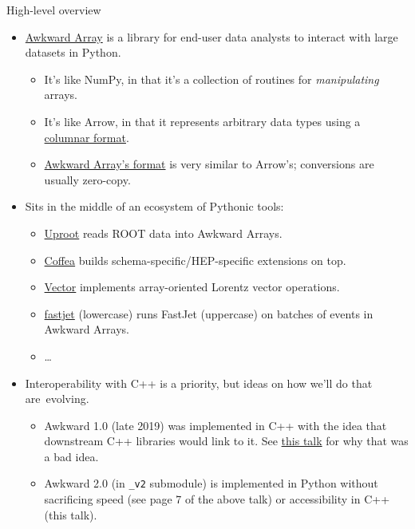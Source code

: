 \documentclass[aspectratio=169]{beamer}
\begin{document}
\begin{frame}{High-level overview}
\vspace{0.4 cm}
\begin{itemize}\setlength{\itemsep}{0.25 cm}
\item \textcolor{blue}{\href{https://inspirehep.net/literature/1806222}{Awkward Array}} is a library for end-user data analysts to interact with large datasets in Python.
\begin{itemize}
\item It's like NumPy, in that it's a collection of routines for {\it manipulating} arrays.
\item It's like Arrow, in that it represents arbitrary data types using a \textcolor{blue}{\href{https://arrow.apache.org/docs/format/Columnar.html}{columnar format}}.
\item \textcolor{blue}{\href{https://awkward-array.readthedocs.io/en/latest/ak.layout.Content.html}{Awkward Array's format}} is very similar to Arrow's; conversions are usually zero-copy.
\end{itemize}

\item<2-> Sits in the middle of an ecosystem of Pythonic tools:
\begin{itemize}
\item \textcolor{blue}{\href{https://pypi.org/project/uproot/}{Uproot}} reads ROOT data into Awkward Arrays.
\item \textcolor{blue}{\href{https://pypi.org/project/coffea/}{Coffea}} builds schema-specific/HEP-specific extensions on top.
\item \textcolor{blue}{\href{https://pypi.org/project/vector/}{Vector}} implements array-oriented Lorentz vector operations.
\item \textcolor{blue}{\href{https://pypi.org/project/fastjet/}{fastjet}} (lowercase) runs FastJet (uppercase) on batches of events in Awkward Arrays.
\item \ldots
\end{itemize}

\item<3-> Interoperability with C++ is a priority, but ideas on how we'll do that \mbox{are evolving.\hspace{-1 cm}}
\begin{itemize}
\item Awkward 1.0 (late 2019) was implemented in C++ with the idea that downstream C++ libraries would link to it. See \textcolor{blue}{\href{https://indico.cern.ch/event/855454/contributions/4605044/}{this talk}} for why that was a bad idea.
\item Awkward 2.0 (in \texttt{_v2} submodule) is implemented in Python without sacrificing speed (see page 7 of the above talk) or accessibility in C++ (this talk).
\end{itemize}

\end{itemize}
\end{frame}
\end{document}
